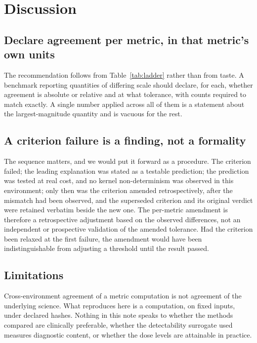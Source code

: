 \documentclass[11pt]{article}
\begin{document}
\section{Discussion}

\subsection{Declare agreement per metric, in that metric's own units}

The recommendation follows from Table~\ref{tab:ladder} rather than from taste. A benchmark reporting
quantities of differing scale should declare, for each, whether agreement is absolute or relative
and at what tolerance, with counts required to match exactly. A single number applied across all of
them is a statement about the largest-magnitude quantity and is vacuous for the rest.

\subsection{A criterion failure is a finding, not a formality}

The sequence matters, and we would put it forward as a procedure. The criterion failed; the leading
explanation was stated as a testable prediction; the prediction was tested at real cost, and no
kernel non-determinism was observed in this environment; only then was the criterion amended
retrospectively, after the mismatch had been observed, and the superseded criterion and its original
verdict were retained verbatim beside the new one. The per-metric amendment is therefore a
retrospective adjustment based on the observed differences, not an independent or prospective
validation of the amended tolerance. Had the criterion been relaxed at the first failure, the
amendment would have been indistinguishable from adjusting a threshold until the result passed.

\subsection{Limitations}

Cross-environment agreement of a metric computation is not agreement of the underlying science.
What reproduces here is a computation, on fixed inputs, under declared hashes. Nothing in this note
speaks to whether the methods compared are clinically preferable, whether the detectability
surrogate used measures diagnostic content, or whether the dose levels are attainable in practice.
\end{document}
